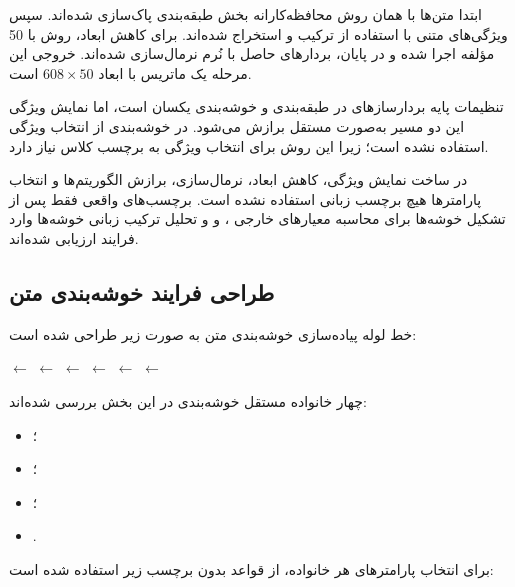 \documentclass[12pt,a4paper,oneside]{report}
\begin{document}
ابتدا متن‌ها با همان روش محافظه‌کارانه بخش طبقه‌بندی پاک‌سازی شده‌اند. سپس ویژگی‌های متنی با استفاده از ترکیب
و
استخراج شده‌اند. برای کاهش ابعاد، روش
با 50 مؤلفه اجرا شده و در پایان، بردارهای حاصل با نُرم
نرمال‌سازی شده‌اند. خروجی این مرحله یک ماتریس با ابعاد
$608\times50$
است.

تنظیمات پایه بردارسازهای
در طبقه‌بندی و خوشه‌بندی یکسان است، اما نمایش ویژگی این دو مسیر به‌صورت مستقل برازش می‌شود. در خوشه‌بندی از انتخاب ویژگی
استفاده نشده است؛ زیرا این روش برای انتخاب ویژگی به برچسب کلاس نیاز دارد.

در ساخت نمایش ویژگی، کاهش ابعاد، نرمال‌سازی، برازش الگوریتم‌ها و انتخاب پارامترها هیچ برچسب زبانی استفاده نشده است. برچسب‌های واقعی فقط پس از تشکیل خوشه‌ها برای محاسبه معیارهای خارجی
،
و
و تحلیل ترکیب زبانی خوشه‌ها وارد فرایند ارزیابی شده‌اند.


\subsection{طراحی فرایند خوشه‌بندی متن}

خط لوله پیاده‌سازی خوشه‌بندی متن به صورت زیر طراحی شده است:

\begin{center}
$\longleftarrow$
$\longleftarrow$
$\longleftarrow$
$\longleftarrow$
$\longleftarrow$
$\longleftarrow$
\end{center}

چهار خانواده مستقل خوشه‌بندی در این بخش بررسی شده‌اند:

\begin{itemize}
	\item {}؛
	\item {}؛
	\item {}؛
	\item {}.
\end{itemize}

برای انتخاب پارامترهای هر خانواده، از قواعد بدون برچسب زیر استفاده شده است:
\end{document}
